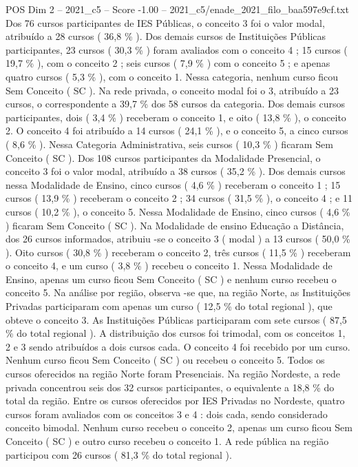 \begin{textsample}{POS Dim 2 – 2021\_c5 – Score -1.00 – 2021\_c5/enade\_2021\_filo\_baa597e9cf.txt}
Dos 76 cursos participantes de IES Públicas, o conceito 3 foi o valor modal, atribuído a 28 cursos ( 36,8 \% ).
Dos demais cursos de Instituições Públicas participantes, 23 cursos ( 30,3 \% ) foram avaliados com o conceito 4 ; 15 cursos ( 19,7 \% ), com o conceito 2 ; seis cursos ( 7,9 \% ) com o conceito 5 ; e apenas quatro cursos ( 5,3 \% ), com o conceito 1.
Nessa categoria, nenhum curso ficou Sem Conceito ( SC ).
Na rede privada, o conceito modal foi o 3, atribuído a 23 cursos, o correspondente a 39,7 \% dos 58 cursos da categoria.
Dos demais cursos participantes, dois ( 3,4 \% ) receberam o conceito 1, e oito ( 13,8 \% ), o conceito 2.
O conceito 4 foi atribuído a 14 cursos ( 24,1 \% ), e o conceito 5, a cinco cursos ( 8,6 \% ).
Nessa Categoria Administrativa, seis cursos ( 10,3 \% ) ficaram Sem Conceito ( SC ).
Dos 108 cursos participantes da Modalidade Presencial, o conceito 3 foi o valor modal, atribuído a 38 cursos ( 35,2 \% ).
Dos demais cursos nessa Modalidade de Ensino, cinco cursos ( 4,6 \% ) receberam o conceito 1 ; 15 cursos ( 13,9 \% ) receberam o conceito 2 ; 34 cursos ( 31,5 \% ), o conceito 4 ; e 11 cursos ( 10,2 \% ), o conceito 5.
Nessa Modalidade de Ensino, cinco cursos ( 4,6 \% ) ficaram Sem Conceito ( SC ).
Na Modalidade de ensino Educação a Distância, dos 26 cursos informados, atribuiu -se o conceito 3 ( modal ) a 13 cursos ( 50,0 \% ).
Oito cursos ( 30,8 \% ) receberam o conceito 2, três cursos ( 11,5 \% ) receberam o conceito 4, e um curso ( 3,8 \% ) recebeu o conceito 1.
Nessa Modalidade de Ensino, apenas um curso ficou Sem Conceito ( SC ) e nenhum curso recebeu o conceito 5.
Na análise por região, observa -se que, na região Norte, as Instituições Privadas participaram com apenas um curso ( 12,5 \% do total regional ), que obteve o conceito 3.
As Instituições Públicas participaram com sete cursos ( 87,5 \% do total regional ).
A distribuição dos cursos foi trimodal, com os conceitos 1, 2 e 3 sendo atribuídos a dois cursos cada.
O conceito 4 foi recebido por um curso.
Nenhum curso ficou Sem Conceito ( SC ) ou recebeu o conceito 5.
Todos os cursos oferecidos na região Norte foram Presenciais.
Na região Nordeste, a rede privada concentrou seis dos 32 cursos participantes, o equivalente a 18,8 \% do total da região.
Entre os cursos oferecidos por IES Privadas no Nordeste, quatro cursos foram avaliados com os conceitos 3 e 4 : dois cada, sendo considerado conceito bimodal.
Nenhum curso recebeu o conceito 2, apenas um curso ficou Sem Conceito ( SC ) e outro curso recebeu o conceito 1.
A rede pública na região participou com 26 cursos ( 81,3 \% do total regional ).

\end{textsample}
